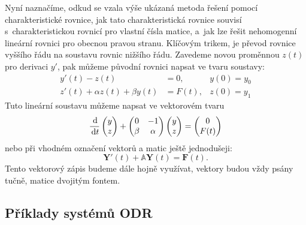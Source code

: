 \documentclass[a4paper, 12pt]{book}
\theoremstyle{definition}
\def\d{\,{\rm d}}               %
\def\vc#1{\mathbf{\boldsymbol{#1}}}     %
\def\tn#1{{\mathbb{#1}}}    %
\begin{document}
Nyní naznačíme, odkud se vzala výše ukázaná metoda řešení pomocí charakteristické rovnice, jak tato charakteristická rovnice souvisí s~charakteristickou rovnicí pro vlastní čísla matice,
a~jak lze řešit nehomogenní lineární rovnici pro obecnou pravou stranu. Klíčovým trikem, je převod rovnice vyššího řádu na soustavu rovnic nižšího řádu. Zavedeme novou proměnnou $z(t)$ pro derivaci $y'$,
pak můžeme původní rovnici napsat ve tvaru soustavy:
\begin{align}
   y'(t) - z(t) &= 0, & y(0) = y_0\\
   z'(t) + \alpha z(t) + \beta y(t) &= F(t), & z(0)= y_1
\end{align}
Tuto lineární soustavu můžeme napsat ve vektorovém tvaru
\[
    \frac{\d}{\d t}    
    \begin{pmatrix}
       y \\ z
    \end{pmatrix}
    +
    \begin{pmatrix}
        0  & -1\\
        \beta & \alpha
    \end{pmatrix}
    \begin{pmatrix}
        y \\ z
    \end{pmatrix}
    =
    \begin{pmatrix}
     0 \\ F(t)
    \end{pmatrix}
\]
nebo při vhodném označení vektorů a matic ještě jednodušeji:
\[
    \vc Y'(t) + \tn A \vc Y(t) = \vc F(t).
\]
Tento vektorový zápis budeme dále hojně využívat, vektory budou vždy psány tučně, matice dvojitým fontem.




\subsection{Příklady systémů ODR}
\end{document}
